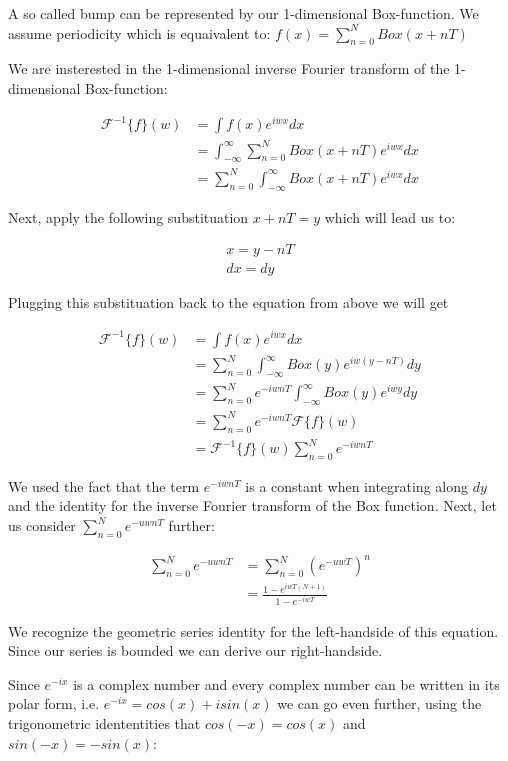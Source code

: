 A so called bump can be represented by our 1-dimensional Box-function. We assume periodicity which is equaivalent to:   
$f(x) = \sum_{n=0}^{N} Box(x+nT)$

We are insterested in the 1-dimensional inverse Fourier transform of the 1-dimensional Box-function:

\begin{align*}
\mathcal{F}^{-1}\{f\}(w)
& =\int f(x) e^{iwx}dx\\
& =\int_{-\infty}^{\infty} \sum_{n=0}^{N} Box(x+nT) e^{iwx}dx\\
& =\sum_{n=0}^{N} \int_{-\infty}^{\infty} Box(x+nT) e^{iwx}dx
\end{align*}

Next, apply the following substituation $x+nT = y$ which will lead us to:

\begin{gather*}
x=y-nT\\
dx=dy
\end{gather*} 

Plugging this substituation back to the equation from above we will get 

\begin{align*}
\mathcal{F}^{-1}\{f\}(w)
& =\int f(x) e^{iwx}dx\\
& =\sum_{n=0}^{N} \int_{-\infty}^{\infty} Box(y) e^{iw(y-nT)}dy \\
& =\sum_{n=0}^{N} e^{-iwnT} \int_{-\infty}^{\infty} Box(y) e^{iwy}dy \\
& =\sum_{n=0}^{N} e^{-iwnT} \mathcal{F}\{f\}(w) \\
& =\mathcal{F}^{-1}\{f\}(w) \sum_{n=0}^{N} e^{-iwnT}  
\end{align*}

We used the fact that the term $e^{-iwnT}$ is a constant when integrating along $dy$ and the identity for the inverse Fourier transform of the Box function. Next, let us consider $\sum_{n=0}^N e^{-uwnT}$ further:

\begin{align*}
\sum_{n=0}^N e^{-uwnT}
& =\sum_{n=0}^N (e^{-uwT})^n \\
& =\frac{1-e^{iwT(N+1)}}{1-e^{-iwT}}
\end{align*}

We recognize the geometric series identity for the left-handside of this equation. Since our series is bounded we can derive our right-handside.

Since $e^{-ix}$ is a complex number and every complex number can be written in its polar form, i.e. $e^{-ix} = cos(x) + i sin(x)$ we can go even further, using the trigonometric idententities that $cos(-x) = cos(x)$ and $sin(-x) = -sin(x)$:

